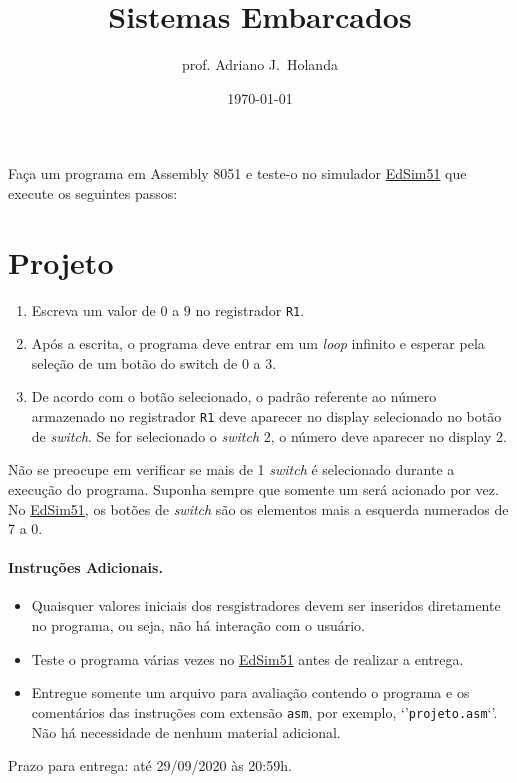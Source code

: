 \documentclass{article}
\def\edsim{\href{https://www.edsim51.com/index.html}{EdSim51}}
\newcounter{prjnum}
\def\project{\section*{Projeto \arabic{prjnum}}}
\def\switch{
  \project
  \begin{enumerate}
  \item Escreva um valor de $0$ a $9$ no registrador {\tt R1}.
  \item Após a escrita, o programa deve entrar em um {\it loop\/}
    infinito e esperar pela seleção de um botão do switch de
    $0$ a $3$.
  \item De acordo com o botão selecionado, o padrão referente ao
    número armazenado no registrador {\tt R1} deve aparecer no
    display selecionado no botão de {\it switch\/}. Se for selecionado
    o {\it switch\/} 2, o número deve aparecer no display 2.
  \end{enumerate}

  Não se preocupe em verificar se mais de 1 {\it switch\/} é selecionado
  durante a execução do programa. Suponha sempre que somente um {\it \/}
  será acionado por vez. No \edsim{}, os botões de {\it switch} são os elementos
  mais a esquerda numerados de 7 a 0.
}
\def\sum{
  \project
  \begin{enumerate}
  \item Escreva um valor de $0$ a $3$ no registrador {\tt R0} e outro
    de $0$ a $6$ no registrador {\tt R1}, efetuando a soma e escrevendo
    o resultado no registrador {\tt R1}.
  \item Após a escrita, o programa deve entrar em um {\it loop\/}
    infinito e selecionar o display equivalente ao número armazenado
    no registrador {\tt R0}. Por exemplo, se o registrador {\tt R0}
    estiver armazenando o número $2$, o display 2 deve ser
    selecionado.
  \item Após a seleção, o padrão referente ao resultado da soma armazenada
    no registrador {\tt R1} deve aparecer no display selecionado.
  \end{enumerate}

}
\begin{document}
\title{Sistemas Embarcados}
\author{prof. Adriano J.\ Holanda}
\date{\today}
\maketitle

Faça um programa em Assembly 8051 e teste-o no simulador \edsim{} que
execute os seguintes passos:

\switch{}

\paragraph{Instruções Adicionais.}
\begin{itemize}
\item Quaisquer valores iniciais dos resgistradores devem ser inseridos
  diretamente no programa, ou seja, não há interação com o usuário.
\item Teste o programa várias vezes no \edsim{} antes de realizar a
  entrega.
\item Entregue somente um arquivo para avaliação contendo o programa e
  os comentários das instruções com extensão {\tt asm}, por exemplo,
  `'{\tt projeto.asm}`'. Não há necessidade de nenhum material
  adicional.
\end{itemize}

\vfill
\noindent Prazo para entrega: até 29/09/2020 às 20:59h.
\end{document}
